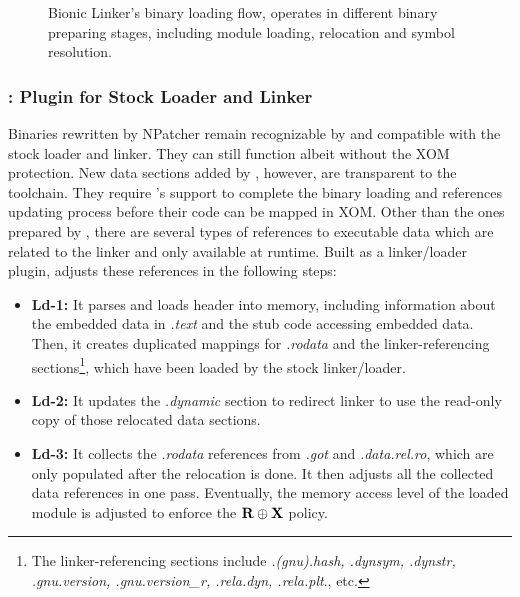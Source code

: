 \begin{figure}[t]
\begin{minipage}[b]{0.5\textwidth}
		\caption{Bionic Linker's binary loading flow, \NLoader operates in different binary preparing stages, including module loading, relocation and symbol resolution.}
		\label{fig:noraxld}
	\end{minipage}
\end{figure}




\subsubsection{\NLoader: Plugin for Stock Loader and Linker}
\label{subsec:loader}
Binaries rewritten by NPatcher remain recognizable by and compatible with the stock loader and linker. They can still function albeit without the XOM protection. 
New data sections added by \NORAX, however, are transparent to the toolchain. They require \NLoader's support to complete the binary loading and references updating process before their code can be mapped in XOM. 
Other than the ones prepared by \NPatcher, there are several types of references to executable data which are related to the linker and only available at runtime. Built as a linker/loader plugin, \NLoader adjusts these references in the following steps: 
\begin{itemize}
	\item {\bf{Ld-1:}} It  parses and loads \NORAX header into memory, including information about the embedded data in \textit{.text} and the stub code accessing embedded data. Then, it creates duplicated mappings for \textit{.rodata} and the linker-referencing sections\footnote{The linker-referencing sections include \textit{.(gnu).hash, .dynsym, .dynstr, .gnu.version, .gnu.version\_r, .rela.dyn, .rela.plt}., etc.}, which have been loaded by the stock linker/loader.    
	\item {\bf{Ld-2:}} It updates the \textit{.dynamic} section to redirect linker to use the read-only copy of those relocated data sections.
	\item {\bf{Ld-3:}} It collects the \textit{.rodata} references from \textit{.got} and \textit{.data.rel.ro}, which are only populated after the relocation is done. It then adjusts all the collected data references in one pass. Eventually, the memory access level of the loaded module is adjusted to enforce the $\bf{R}\oplus\bf{X}$ policy.
\end{itemize} 


